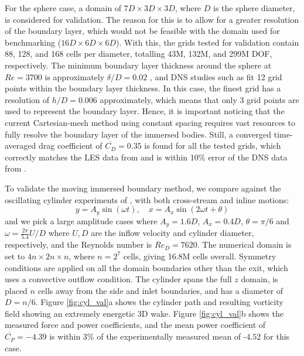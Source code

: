 \documentclass[10pt,a4paper]{article}
\begin{document}
For the sphere case, a domain of $7D\times3D\times3D$, where $D$ is the sphere diameter, is considered for validation. The reason for this is to allow for a greater resolution of the boundary layer, which would not be feasible with the domain used for benchmarking ($16D\times6D\times6D$). With this, the grids tested for validation contain 88, 128, and 168 cells per diameter, totalling 43M, 132M, and 299M DOF, respectively. The minimum boundary layer thickness around the sphere at $Re=3700$ is approximately $\delta/D=0.02$ \citep{Capuano2023}, and DNS studies such as \cite{Rodriguez2011} fit 12 grid points within the boundary layer thickness. In this case, the finest grid has a resolution of $h/D=0.006$ approximately, which means that only 3 grid points are used to represent the boundary layer. Hence, it is important noticing that the current Cartesian-mesh method using constant spacing requires vast resources to fully resolve the boundary layer of the immersed bodies. Still, a converged time-averaged drag coefficient of $\overline{C_D}=0.35$ is found for all the tested grids, which correctly matches the LES data from \cite{Yun2006} and is within 10\% error of the DNS data from \cite{Rodriguez2011}.

To validate the moving immersed boundary method, we compare against the oscillating cylinder experiments of \citep{Aktosun2024}, with both cross-stream and inline motions:
\begin{equation*}
    y = A_y\sin(\omega t), \quad x = A_x\sin(2\omega t+\theta)
\end{equation*}
and we pick a large amplitude cases where $A_y=1.6D$, $A_x=0.4D$, $\theta=\pi/6$ and $\omega=\frac{2\pi}{5.4} U/D$ where $U,D$ are the inflow velocity and cylinder diameter, respectively, and the Reynolds number is $Re_D=7620$. The numerical domain is set to $4n \times 2n \times n$, where $n=2^7$ cells, giving 16.8M cells overall. Symmetry conditions are applied on all the domain boundaries other than the exit, which uses a convective outflow condition. The cylinder spans the full $z$ domain, is placed $n$ cells away from the side and inlet boundaries, and has a diameter of $D=n/6$. Figure \ref{fig:cyl_val}a shows the cylinder path and resulting vorticity field showing an extremely energetic 3D wake.  Figure \ref{fig:cyl_val}b shows the measured force and power coefficients, and the mean power coefficient of $\overline{C_P}=-4.39$ is within 3\% of the experimentally measured mean of -$4.52$ for this case.
\end{document}
